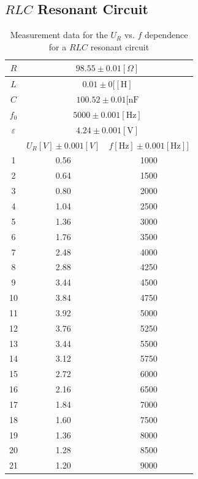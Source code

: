 \documentclass[12pt]{article}
\begin{document}
\subsection{$RLC$ Resonant Circuit}
\begin{table}[H]
\centering
\begin{tabular}{|c|c|c|}
\hline
$R$   & \multicolumn{2}{c|}{$98.55\pm0.01[\Omega]$} \\ \hline
$L$   & \multicolumn{2}{c|}{$0.01\pm0[\mathrm{[H]}$} \\ \hline
$C$   & \multicolumn{2}{c|}{$100.52\pm0.01[\mathrm{nF}$} \\ \hline
$f_0$   & \multicolumn{2}{c|}{$5000\pm0.001[\mathrm{Hz}]$} \\ \hline
$\varepsilon$   & \multicolumn{2}{c|}{$4.24\pm0.001[\mathrm{V}]$} \\ \hline
   &$U_R[V]\pm0.001[V]$           & $f[\mathrm{Hz}]\pm0.001[\mathrm{Hz}]]$          \\ \hline
1  & 0.56      & 1000      \\ \hline
2  & 0.64      & 1500      \\ \hline
3  & 0.80      & 2000      \\ \hline
4  & 1.04      & 2500      \\ \hline
5  & 1.36      & 3000      \\ \hline
6  & 1.76      & 3500      \\ \hline
7  & 2.48      & 4000      \\ \hline
8  & 2.88      & 4250      \\ \hline
9  & 3.44      & 4500      \\ \hline
10 & 3.84      & 4750      \\ \hline
11 & 3.92      & 5000      \\ \hline
12 & 3.76      & 5250      \\ \hline
13 & 3.44      & 5500      \\ \hline
14 & 3.12      & 5750      \\ \hline
15 & 2.72      & 6000      \\ \hline
16 & 2.16      & 6500      \\ \hline
17 & 1.84      & 7000      \\ \hline
18 & 1.60      & 7500      \\ \hline
19 & 1.36      & 8000      \\ \hline
20 & 1.28      & 8500      \\ \hline
21 & 1.20      & 9000      \\ \hline
\end{tabular}
\caption{Measurement data for the $U_R$ vs. $f$ dependence for a $RLC$ resonant circuit}
\end{table}
\end{document}
